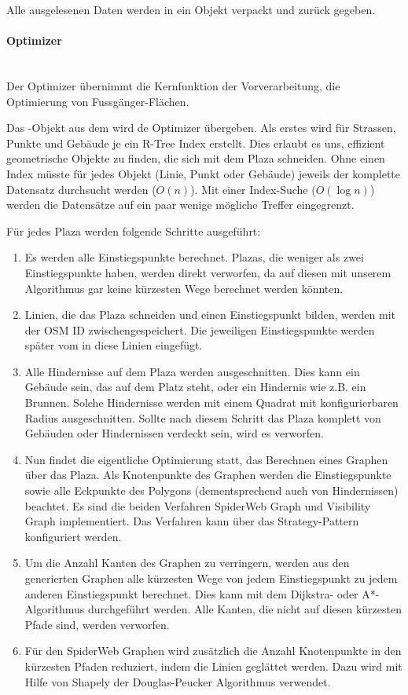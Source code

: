 Alle ausgelesenen Daten werden in ein  Objekt verpackt und zurück gegeben.

\paragraph{Optimizer}\label{impl:Optimizer}~\\
Der Optimizer übernimmt die Kernfunktion der Vorverarbeitung, die Optimierung von Fussgänger-Flächen.

Das -Objekt aus dem  wird de Optimizer übergeben. Als erstes wird für Strassen, Punkte und Gebäude je ein R-Tree \cite{rtree_Guttman} Index erstellt. Dies erlaubt es uns, effizient geometrische Objekte zu finden, die sich mit dem Plaza schneiden. Ohne einen Index müsste für jedes Objekt (Linie, Punkt oder Gebäude) jeweils der komplette Datensatz durchsucht werden ($O(n)$). Mit einer Index-Suche ($O(\log n)$) werden die Datensätze auf ein paar wenige mögliche Treffer eingegrenzt.

Für jedes Plaza werden folgende Schritte ausgeführt:
\begin{enumerate}
    \item Es werden alle \gls{Einstiegspunkt}e berechnet. Plazas, die weniger als zwei Einstiegspunkte haben, werden direkt verworfen, da auf diesen mit unserem Algorithmus gar keine kürzesten Wege berechnet werden könnten.
    \item Linien, die das Plaza schneiden und einen \gls{Einstiegspunkt} bilden, werden mit der \ac{OSM} ID zwischengespeichert. Die jeweiligen \gls{Einstiegspunkt}e werden später vom  in diese Linien eingefügt.
    \item Alle Hindernisse auf dem Plaza werden ausgeschnitten. Dies kann ein Gebäude sein, das auf dem Platz steht, oder ein Hindernis wie z.B. ein Brunnen. Solche Hindernisse werden mit einem Quadrat mit konfigurierbaren Radius ausgeschnitten. Sollte nach diesem Schritt das Plaza komplett von Gebäuden oder Hindernissen verdeckt sein, wird es verworfen.
    \item Nun findet die eigentliche Optimierung statt, das Berechnen eines Graphen über das Plaza. Als Knotenpunkte des Graphen werden die \gls{Einstiegspunkt}e sowie alle Eckpunkte des Polygons (dementsprechend auch von Hindernissen) beachtet. Es sind die beiden Verfahren SpiderWeb Graph und Visibility Graph implementiert. Das Verfahren kann über das Strategy-Pattern \cite{gof_patterns} konfiguriert werden.
    \item Um die Anzahl Kanten des Graphen zu verringern, werden aus den generierten Graphen alle kürzesten Wege von jedem Einstiegspunkt zu jedem anderen Einstiegspunkt berechnet. Dies kann mit dem Dijkstra- \cite{dijkstra_algorithm} oder A*-Algorithmus \cite{astar} durchgeführt werden. Alle Kanten, die nicht auf diesen kürzesten Pfade sind, werden verworfen.
    \item Für den SpiderWeb Graphen wird zusätzlich die Anzahl Knotenpunkte in den kürzesten Pfaden reduziert, indem die Linien geglättet werden. Dazu wird mit Hilfe von Shapely \cite{shapely} der Douglas-Peucker Algorithmus \cite{douglas-peucker_algorithm} verwendet.
\end{enumerate}


